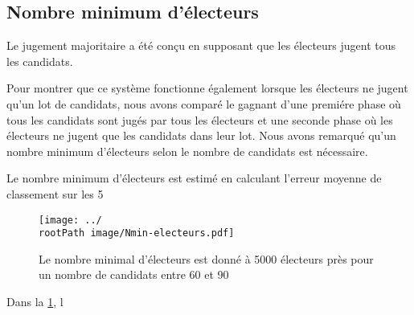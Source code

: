 \documentclass[conference]{IEEEtran}
\newcommand*{\rootPath}{../}
\begin{document}
\subsection{Nombre minimum d'\'electeurs}

Le jugement majoritaire a \'et\'e con\c{c}u en supposant que les \'electeurs jugent tous les candidats. 

Pour montrer que ce syst\`eme fonctionne \'egalement lorsque les \'electeurs ne jugent qu'un lot de candidats, nous avons compar\'e le gagnant d'une premi\'ere phase o\`u tous les candidats sont jug\'es par tous les \'electeurs et une seconde phase o\`u les \'electeurs ne jugent que les candidats dans leur lot. Nous avons remarqu\'e qu'un nombre minimum d'\'electeurs selon le nombre de candidats est n\'ecessaire.

Le nombre minimum d'\'electeurs est estim\'e en calculant l'erreur moyenne de classement sur les 5 
\begin{figure}[!ht]
  \centering
  \texttt{[image: ../\\rootPath image/Nmin-electeurs.pdf]}
  \caption{Le nombre minimal d'\'electeurs est donn\'e \`a 5000 \'electeurs pr\`es pour un nombre de candidats entre 60 et 90}
  \label{fig:rem}
\end{figure}

Dans la \cref{fig:rem}, l
\end{document}
